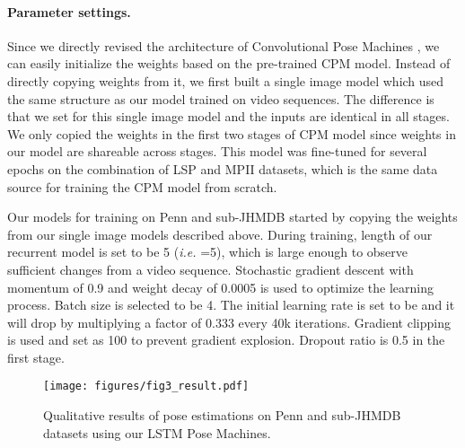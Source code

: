 \documentclass[10pt,twocolumn,letterpaper]{article}
\begin{document}
\vspace{-4.5mm}
\paragraph{Parameter settings.} Since we directly revised the architecture of Convolutional Pose Machines \cite{wei16refineCPM}, we can easily initialize the weights based on the pre-trained CPM model. Instead of directly copying weights from it, we first built a single image model which used the same structure as our model trained on video sequences. The difference is that we set  for this single image model and the inputs are identical in all stages. We only copied the weights in the first two stages of CPM model since weights in our model are shareable across stages. This model was fine-tuned for several epochs on the combination of LSP \cite{john11lsp} and MPII \cite{andr14mpii} datasets, which is the same data source for training the CPM model from scratch.

Our models for training on Penn and sub-JHMDB started by copying the weights from our single image models described above. During training, length of our recurrent model is set to be 5 (\textit{i.e.} =5), which is large enough to observe sufficient changes from a video sequence. Stochastic gradient descent with momentum of 0.9 and weight decay of 0.0005 is used to optimize the learning process. Batch size is selected to be 4. The initial learning rate is set to be  and it will drop by multiplying a factor of 0.333 every 40k iterations. Gradient clipping is used and set as 100 to prevent gradient explosion. Dropout ratio is 0.5 in the first stage.

\begin{figure*}[htbp]
  \center
  \texttt{[image: figures/fig3\_result.pdf]}
  \vspace{-18pt}
  \caption{Qualitative results of pose estimations on Penn and sub-JHMDB datasets using our LSTM Pose Machines.}
  \label{results}
  \vspace{-18pt}
\end{figure*}
\end{document}
